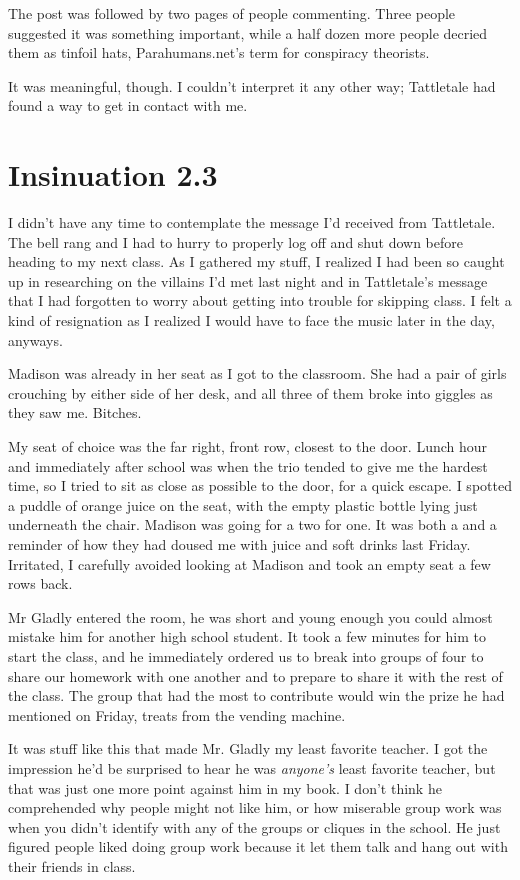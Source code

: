 The post was followed by two pages of people commenting. Three people suggested it was something important, while a half dozen more people decried them as tinfoil hats, Parahumans.net's term for conspiracy theorists.

It was meaningful, though. I couldn't interpret it any other way; Tattletale had found a way to get in contact with me.


\chapter{Insinuation 2.3}

I didn't have any time to contemplate the message I'd received from Tattletale. The bell rang and I had to hurry to properly log off and shut down before heading to my next class. As I gathered my stuff, I realized I had been so caught up in researching on the villains I'd met last night and in Tattletale's message that I had forgotten to worry about getting into trouble for skipping class. I felt a kind of resignation as I realized I would have to face the music later in the day, anyways.

Madison was already in her seat as I got to the classroom. She had a pair of girls crouching by either side of her desk, and all three of them broke into giggles as they saw me. Bitches.

My seat of choice was the far right, front row, closest to the door. Lunch hour and immediately after school was when the trio tended to give me the hardest time, so I tried to sit as close as possible to the door, for a quick escape. I spotted a puddle of orange juice on the seat, with the empty plastic bottle lying just underneath the chair. Madison was going for a two for one. It was both a  and a reminder of how they had doused me with juice and soft drinks last Friday. Irritated, I carefully avoided looking at Madison and took an empty seat a few rows back.

Mr Gladly entered the room, he was short and young enough you could almost mistake him for another high school student. It took a few minutes for him to start the class, and he immediately ordered us to break into groups of four to share our homework with one another and to prepare to share it with the rest of the class. The group that had the most to contribute would win the prize he had mentioned on Friday, treats from the vending machine.

It was stuff like this that made Mr. Gladly my least favorite teacher. I got the impression he'd be surprised to hear he was {\em anyone's} least favorite teacher, but that was just one more point against him in my book. I don't think he comprehended why people might not like him, or how miserable group work was when you didn't identify with any of the groups or cliques in the school. He just figured people liked doing group work because it let them talk and hang out with their friends in class.

